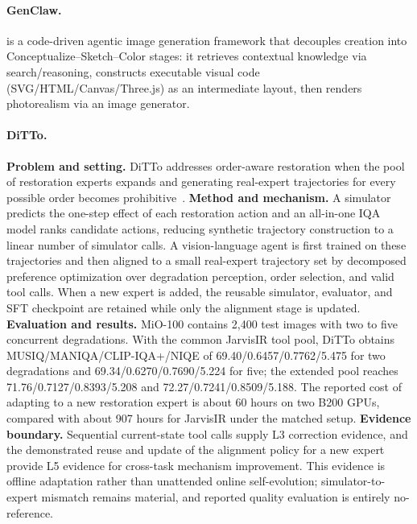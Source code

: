 \paragraph{GenClaw.}
 is a code-driven agentic image generation framework that decouples creation into Conceptualize–Sketch–Color stages: it retrieves contextual knowledge via search/reasoning, constructs executable visual code (SVG/HTML/Canvas/Three.js) as an intermediate layout, then renders photorealism via an image generator. ~\cite{ye2026genclaw}

\paragraph{DiTTo.}
\textbf{Problem and setting.} DiTTo addresses order-aware restoration when the pool of restoration experts expands and generating real-expert trajectories for every possible order becomes prohibitive~\cite{avg260530915}. \textbf{Method and mechanism.} A simulator predicts the one-step effect of each restoration action and an all-in-one IQA model ranks candidate actions, reducing synthetic trajectory construction to a linear number of simulator calls. A vision-language agent is first trained on these trajectories and then aligned to a small real-expert trajectory set by decomposed preference optimization over degradation perception, order selection, and valid tool calls. When a new expert is added, the reusable simulator, evaluator, and SFT checkpoint are retained while only the alignment stage is updated. \textbf{Evaluation and results.} MiO-100 contains 2,400 test images with two to five concurrent degradations. With the common JarvisIR tool pool, DiTTo obtains MUSIQ/MANIQA/CLIP-IQA+/NIQE of 69.40/0.6457/0.7762/5.475 for two degradations and 69.34/0.6270/0.7690/5.224 for five; the extended pool reaches 71.76/0.7127/0.8393/5.208 and 72.27/0.7241/0.8509/5.188. The reported cost of adapting to a new restoration expert is about 60 hours on two B200 GPUs, compared with about 907 hours for JarvisIR under the matched setup. \textbf{Evidence boundary.} Sequential current-state tool calls supply L3 correction evidence, and the demonstrated reuse and update of the alignment policy for a new expert provide L5 evidence for cross-task mechanism improvement. This evidence is offline adaptation rather than unattended online self-evolution; simulator-to-expert mismatch remains material, and reported quality evaluation is entirely no-reference.

